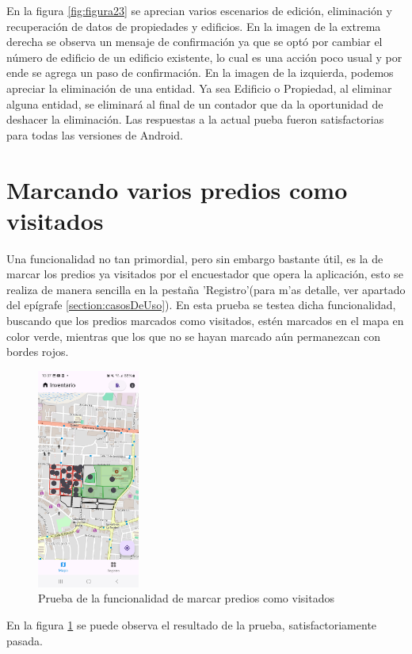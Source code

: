 En la figura \ref{fig:figura23} se aprecian varios escenarios de edición, eliminación y recuperación de datos de propiedades y edificios. En la imagen de la extrema derecha
se observa un mensaje de confirmación ya que se optó por cambiar el número de edificio de un edificio existente, lo cual es una acción poco usual y por ende se agrega un paso de confirmación.
En la imagen de la izquierda, podemos apreciar la eliminación de una entidad. Ya sea Edificio o Propiedad, al eliminar alguna entidad, se eliminará al final de un contador que da la oportunidad
de deshacer la eliminación. Las respuestas a la actual pueba fueron satisfactorias para todas las versiones de Android.


\section{Marcando varios predios como visitados}
Una funcionalidad no tan primordial, pero sin embargo bastante útil, es la de marcar los predios ya visitados por el encuestador que opera la aplicación, esto se realiza de manera sencilla en
la pestaña 'Registro'(para m'as detalle, ver apartado del epígrafe \ref{section:casosDeUso}). En esta prueba se testea dicha funcionalidad, buscando que los predios marcados como visitados, estén
marcados en el mapa en color verde, mientras que los que no se hayan marcado aún permanezcan con bordes rojos.
\begin{figure}[h]
    \centering
    \includegraphics[width=0.3\textwidth]{Graphics/Capitulo 4/Galaxy S23 Ultra Android/4.6/1.jpg}
    \caption{Prueba de la funcionalidad de marcar predios como visitados}
    \label{fig:figura24}
\end{figure}
En la figura \ref{fig:figura24} se puede observa el resultado de la prueba, satisfactoriamente pasada.
\pagebreak
